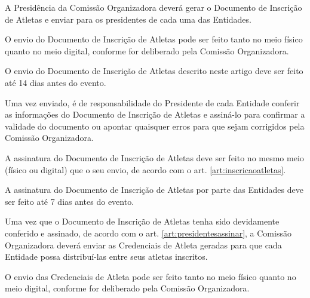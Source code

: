 \begin{article}
    \label{art:inscricaoatletas}
    A Presidência da Comissão Organizadora deverá gerar o Documento de Inscrição de Atletas e enviar para os presidentes de cada uma das Entidades.

	\begin{xparagraph}
	    O envio do Documento de Inscrição de Atletas pode ser feito tanto no meio físico quanto no meio digital, conforme for deliberado pela Comissão Organizadora.
	\end{xparagraph}
	
	\begin{xparagraph}
	    O envio do Documento de Inscrição de Atletas descrito neste artigo deve ser feito até 14 dias antes do evento.
	\end{xparagraph}
\end{article}

\begin{article}
    \label{art:presidentesassinar}
    Uma vez enviado, é de responsabilidade do Presidente de cada Entidade conferir as informações do Documento de Inscrição de Atletas e assiná-lo para confirmar a validade do documento ou apontar quaisquer erros para que sejam corrigidos pela Comissão Organizadora.

	\begin{xparagraph}
	    A assinatura do Documento de Inscrição de Atletas deve ser feito no mesmo meio (físico ou digital) que o seu envio, de acordo com o art. \ref{art:inscricaoatletas}\ulo.
	\end{xparagraph}

	\begin{xparagraph}
	    A assinatura do Documento de Inscrição de Atletas por parte das Entidades deve ser feito até 7 dias antes do evento.
	\end{xparagraph}
\end{article}

\begin{article}
    Uma vez que o Documento de Inscrição de Atletas tenha sido devidamente conferido e assinado, de acordo com o art. \ref{art:presidentesassinar}\ulo, a Comissão Organizadora deverá enviar as Credenciais de Atleta geradas para que cada Entidade possa distribuí-las entre seus atletas inscritos.

	\begin{xparagraph}
	    O envio das Credenciais de Atleta pode ser feito tanto no meio físico quanto no meio digital, conforme for deliberado pela Comissão Organizadora.
	\end{xparagraph}
\end{article}

